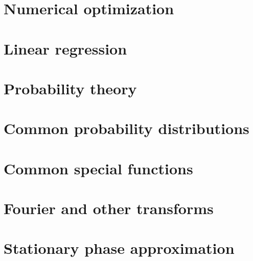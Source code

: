 \documentclass[12pt]{report}
\theoremstyle{definition}
\begin{document}
\chapter{Numerical optimization}
\label{chap:numerical-optmization}

\chapter{Linear regression}
\label{chap:linear-regression}

\appendix

\chapter{Probability theory}
\label{chap:probability-theory}


\chapter{Common probability distributions}
\label{chap:probability-distributions}


\chapter{Common special functions}
\label{chap:special-functions}


\chapter{Fourier and other transforms}
\label{chap:fourier-transforms}


\chapter{Stationary phase approximation}
\label{chap:stationary-phase}


\cleardoublepage 
  
\end{document}
